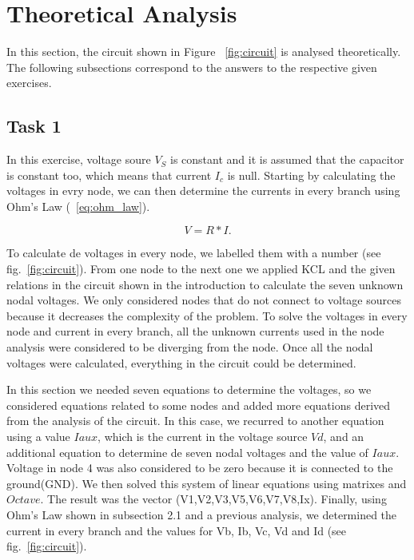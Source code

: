 \section{Theoretical Analysis}
\label{sec:analysis}

In this section, the circuit shown in Figure ~\ref{fig:circuit} is analysed theoretically. The following subsections correspond to the answers to the respective given exercises. 

\subsection{Task 1}

In this exercise, voltage soure $V_{S}$ is constant and it is assumed that the capacitor is constant too, which means that current $I_{c}$ is null.
Starting by calculating the voltages in evry node, we can then determine the currents in every branch using Ohm's Law (~\ref{eq:ohm_law}). 

\begin{equation}
  V= R*I.
  \label{eq:ohm_law}
\end{equation}

To calculate de voltages in every node, we labelled them with a number (see fig.~\ref{fig:circuit}). From one node to the next one we applied KCL and the given relations in the circuit shown in the introduction to calculate the seven unknown nodal voltages. We only considered nodes that do not connect to voltage sources because it decreases the complexity of the problem. 
To solve the voltages in every node and current in every branch, all the unknown currents used in the node analysis were considered to be diverging from the node. Once all the nodal voltages were calculated, everything in the circuit could be determined.

In this section we needed seven equations to determine the voltages, so we considered equations related to some nodes and added more equations derived from the analysis of the circuit. In this case, we recurred to another equation using a value $Iaux$, which is the current in the voltage source $Vd$, and an additional equation to determine de seven nodal voltages and the value of $Iaux$. Voltage in node 4 was also considered to be zero because it is connected to the ground(GND). We then solved this system of linear equations using matrixes and $Octave$. The result was the vector (V1,V2,V3,V5,V6,V7,V8,Ix). Finally, using Ohm’s Law shown in subsection 2.1 and a previous analysis, we determined the current in every branch and the values for Vb, Ib, Vc, Vd and Id (see fig.~\ref{fig:circuit}).


